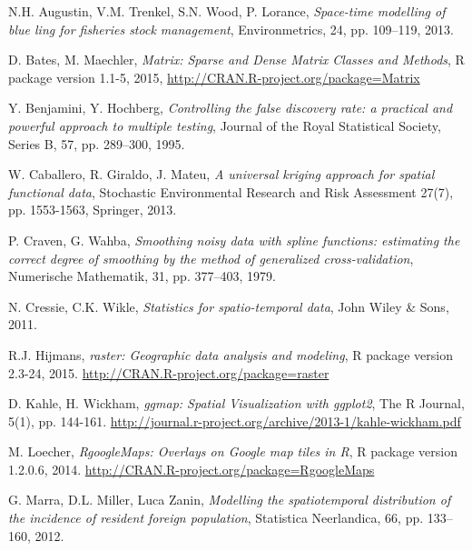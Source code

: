 \documentclass[a4paper,11pt,twoside,openright]{book}							%
\begin{document}
\begin{thebibliography}{99}


N.H. Augustin, V.M. Trenkel, S.N. Wood, P. Lorance, \emph{Space-time modelling of blue ling for fisheries stock management}, Environmetrics, 24, pp. 109–119, 2013.

D. Bates, M. Maechler, \emph{Matrix: Sparse and Dense Matrix Classes and Methods}, R package version 1.1-5, 2015, \href{http://CRAN.R-project.org/package=Matrix}{http://CRAN.R-project.org/package=Matrix}

Y. Benjamini, Y. Hochberg, \emph{Controlling the false discovery rate: a practical and powerful approach to multiple testing}, Journal of the Royal Statistical Society, Series B, 57, pp. 289–300, 1995.

W. Caballero, R. Giraldo, J. Mateu, \emph{A universal kriging approach for spatial functional data}, Stochastic Environmental Research and Risk Assessment 27(7), pp. 1553-1563, Springer, 2013.

P. Craven, G. Wahba, \emph{Smoothing noisy data with spline functions: estimating the correct degree of smoothing by the method of generalized cross-validation}, Numerische Mathematik, 31, pp. 377–403, 1979.

N. Cressie, C.K. Wikle, \emph{Statistics for spatio-temporal data}, John Wiley \& Sons, 2011.

R.J. Hijmans, \emph{raster: Geographic data analysis and modeling}, R package version 2.3-24, 2015. \href{http://CRAN.R-project.org/package=raster}{http://CRAN.R-project.org/package=raster}

D. Kahle, H. Wickham, \emph{ggmap: Spatial Visualization with ggplot2}, The R Journal, 5(1), pp. 144-161. \href{http://journal.r-project.org/archive/2013-1/kahle-wickham.pdf}{http://journal.r-project.org/archive/2013-1/kahle-wickham.pdf}

M. Loecher, \emph{RgoogleMaps: Overlays on Google map tiles in R}, R package version 1.2.0.6, 2014. \href{http://CRAN.R-project.org/package=RgoogleMaps}{http://CRAN.R-project.org/package=RgoogleMaps}

G. Marra, D.L. Miller, Luca Zanin, \emph{Modelling the spatiotemporal distribution of the incidence of resident foreign population}, Statistica Neerlandica, 66, pp. 133–160, 2012.


\end{thebibliography}
\end{document}
